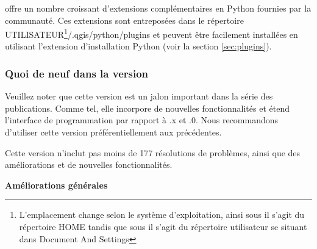 
\qg offre un nombre croissant d'extensions complémentaires en Python fournies par la communauté. Ces extensions sont entreposées dans le répertoire UTILISATEUR\footnote{L'emplacement change selon le système d'exploitation, ainsi sous \nix{} il s'agit du répertoire HOME tandis que sous \win{} il s'agit du répertoire utilisateur se situant dans Document And Settings}/.qgis/python/plugins et peuvent être facilement installées en utilisant l'extension d'installation Python (voir la section \ref{sec:plugins}). 

\subsubsection{Quoi de neuf dans la version ~\CURRENT} 

Veuillez noter que cette version est un jalon important dans la série des publications. Comme tel, elle incorpore de nouvelles fonctionnalités et étend l'interface de programmation par rapport à .x et .0. Nous recommandons d'utiliser cette version préférentiellement aux précédentes.

Cette version n'inclut pas moins de 177 résolutions de problèmes, ainsi que des améliorations et de nouvelles fonctionnalités.

\textbf{Améliorations générales}

